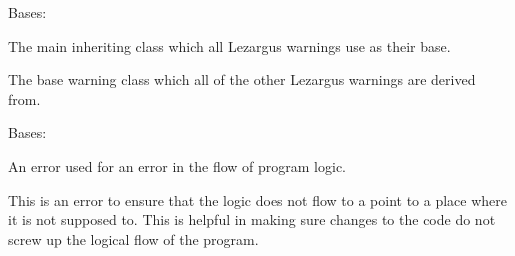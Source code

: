 \documentclass[letterpaper,11pt,english]{sphinxmanual}
\begin{document}

\begin{savenotes}\begin{fulllineitems}
\label{\detokenize{code/lezargus.library.logging:lezargus.library.logging.LezargusWarning}}
\pysigstartsignatures
{}
\pysigstopsignatures
\sphinxAtStartPar
Bases: 

\sphinxAtStartPar
The main inheriting class which all Lezargus warnings use as their base.

\sphinxAtStartPar
The base warning class which all of the other Lezargus warnings
are derived from.

\end{fulllineitems}\end{savenotes}


\begin{savenotes}\begin{fulllineitems}
\label{\detokenize{code/lezargus.library.logging:lezargus.library.logging.LogicFlowError}}
\pysigstartsignatures
{}
\pysigstopsignatures
\sphinxAtStartPar
Bases: {\hyperref[\detokenize{code/lezargus.library.logging:lezargus.library.logging.LezargusBaseError}]{}}

\sphinxAtStartPar
An error used for an error in the flow of program logic.

\sphinxAtStartPar
This is an error to ensure that the logic does not flow to a point to a
place where it is not supposed to. This is helpful in making sure changes
to the code do not screw up the logical flow of the program.

\end{fulllineitems}\end{savenotes}

\end{document}
